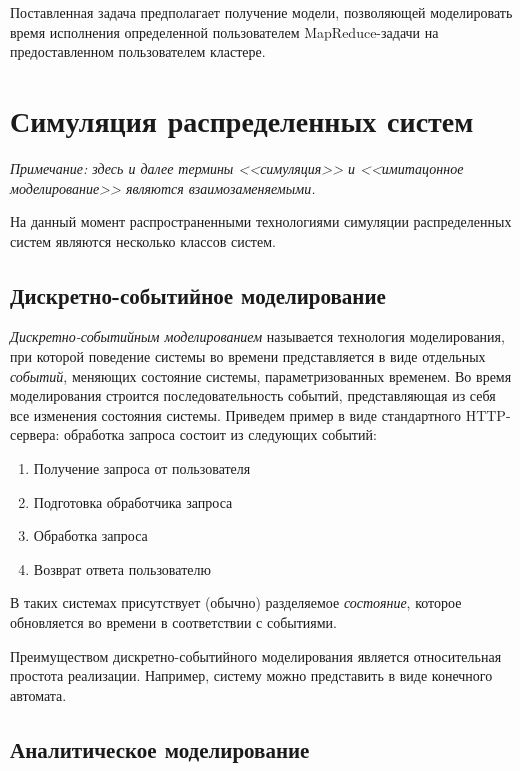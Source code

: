 \documentclass[a4paper,12pt]{article}
\begin{document}
    Поставленная задача предполагает получение модели, позволяющей моделировать
    время исполнения определенной пользователем MapReduce-задачи на
    предоставленном пользователем кластере.

    \section{Симуляция распределенных систем}

    \textit{Примечание: здесь и далее термины <<симуляция>> и <<имитацонное моделирование>> являются взаимозаменяемыми.}

    На данный момент распространенными технологиями симуляции распределенных
    систем являются несколько классов систем.

    \subsection{Дискретно-событийное моделирование}

    \textit{Дискретно-событийным моделированием} называется технология
    моделирования, при которой поведение системы во времени представляется в
    виде отдельных \textit{событий}, меняющих состояние системы,
    параметризованных временем. Во время моделирования строится
    последовательность событий, представляющая из себя все изменения состояния
    системы. Приведем пример в виде стандартного HTTP-сервера: обработка запроса
    состоит из следующих событий:

    \begin{enumerate}
        \item Получение запроса от пользователя
        \item Подготовка обработчика запроса
        \item Обработка запроса
        \item Возврат ответа пользователю
    \end{enumerate}

    В таких системах присутствует (обычно) разделяемое \textit{состояние},
    которое обновляется во времени в соответствии с событиями. 

    Преимуществом дискретно-событийного моделирования является относительная
    простота реализации. Например, систему можно представить в виде конечного
    автомата.

    \subsection{Аналитическое моделирование}
\end{document}

